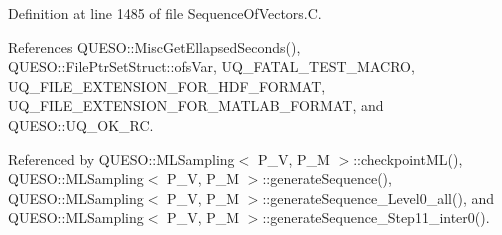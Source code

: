 Definition at line 1485 of file Sequence\-Of\-Vectors.\-C.



References Q\-U\-E\-S\-O\-::\-Misc\-Get\-Ellapsed\-Seconds(), Q\-U\-E\-S\-O\-::\-File\-Ptr\-Set\-Struct\-::ofs\-Var, U\-Q\-\_\-\-F\-A\-T\-A\-L\-\_\-\-T\-E\-S\-T\-\_\-\-M\-A\-C\-R\-O, U\-Q\-\_\-\-F\-I\-L\-E\-\_\-\-E\-X\-T\-E\-N\-S\-I\-O\-N\-\_\-\-F\-O\-R\-\_\-\-H\-D\-F\-\_\-\-F\-O\-R\-M\-A\-T, U\-Q\-\_\-\-F\-I\-L\-E\-\_\-\-E\-X\-T\-E\-N\-S\-I\-O\-N\-\_\-\-F\-O\-R\-\_\-\-M\-A\-T\-L\-A\-B\-\_\-\-F\-O\-R\-M\-A\-T, and Q\-U\-E\-S\-O\-::\-U\-Q\-\_\-\-O\-K\-\_\-\-R\-C.



Referenced by Q\-U\-E\-S\-O\-::\-M\-L\-Sampling$<$ P\-\_\-\-V, P\-\_\-\-M $>$\-::checkpoint\-M\-L(), Q\-U\-E\-S\-O\-::\-M\-L\-Sampling$<$ P\-\_\-\-V, P\-\_\-\-M $>$\-::generate\-Sequence(), Q\-U\-E\-S\-O\-::\-M\-L\-Sampling$<$ P\-\_\-\-V, P\-\_\-\-M $>$\-::generate\-Sequence\-\_\-\-Level0\-\_\-all(), and Q\-U\-E\-S\-O\-::\-M\-L\-Sampling$<$ P\-\_\-\-V, P\-\_\-\-M $>$\-::generate\-Sequence\-\_\-\-Step11\-\_\-inter0().



